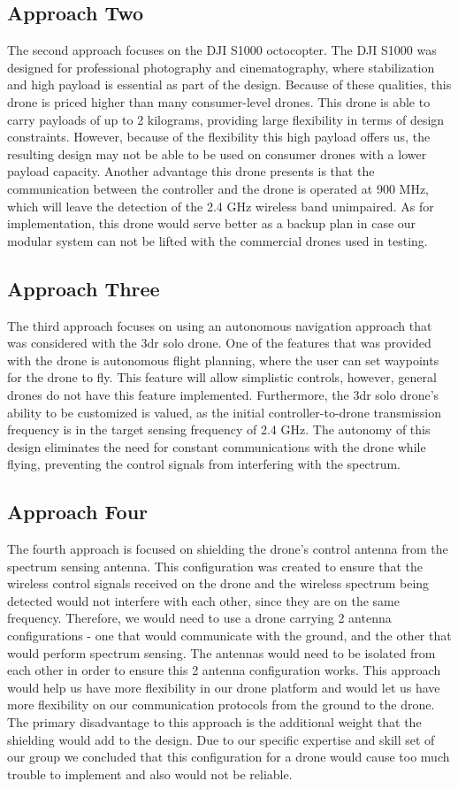 \subsection{Approach Two}
The second approach focuses on the DJI S1000 octocopter. The DJI S1000 was designed for professional photography and cinematography, where stabilization and high payload is essential as part of the design. Because of these qualities, this drone is priced higher than many consumer-level drones. This drone is able to carry payloads of up to 2 kilograms, providing large flexibility in terms of design constraints. However, because of the flexibility this high payload offers us, the resulting design may not be able to be used on consumer drones with a lower payload capacity. Another advantage this drone presents is that the communication between the controller and the drone is operated at 900 MHz, which will leave the detection of the 2.4 GHz wireless band unimpaired. As for implementation, this drone would serve better as a backup plan in case our modular system can not be lifted with the commercial drones used in testing.
\subsection{Approach Three}
The third approach focuses on using an autonomous navigation approach that was considered with the 3dr solo drone. One of the features that was provided with the drone is autonomous flight planning, where the user can set waypoints for the drone to fly. This feature will allow simplistic controls, however, general drones do not have this feature implemented. Furthermore, the 3dr solo drone’s ability to be customized is valued, as the initial controller-to-drone transmission frequency is in the target sensing frequency of 2.4 GHz. The autonomy of this design eliminates the need for constant communications with the drone while flying, preventing the control signals from interfering with the spectrum.
\subsection{Approach Four}
The fourth approach is focused on shielding the drone’s control antenna from the spectrum sensing antenna. This configuration was created to ensure that the wireless control signals received on the drone and the wireless spectrum being detected would not interfere with each other, since they are on the same frequency. Therefore, we would need to use a drone carrying 2 antenna configurations - one that would communicate with the ground, and the other that would perform spectrum sensing. The antennas would need to be isolated from each other in order to ensure this 2 antenna configuration works. This approach would help us have more flexibility in our drone platform and would let us have more flexibility on our communication protocols from the ground to the drone. The primary disadvantage to this approach is the additional weight that the shielding would add to the design. Due to our specific expertise and skill set of our group we concluded that this configuration for a drone would cause too much trouble to implement and also would not be reliable. 
